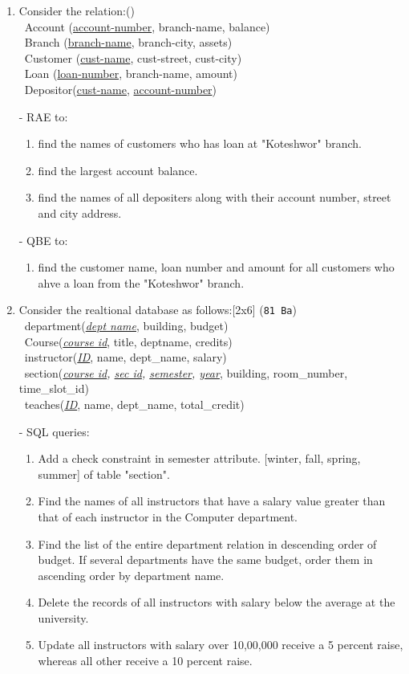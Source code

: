 \documentclass[12pt]{article}
\newcommand{\enter}{\\\textcolor{white}{1}}
\begin{document}
\begin{enumerate}
    \item Consider the relation:\hfill ()
        \enter Account (\underline{account-number}, branch-name, balance)
        \enter Branch (\underline{branch-name}, branch-city, assets)
        \enter Customer (\underline{cust-name}, cust-street, cust-city)
        \enter Loan (\underline{loan-number}, branch-name, amount)
        \enter Depositor(\underline{cust-name}, \underline{account-number})

        - RAE to:
        \begin{enumerate}[noitemsep, topsep = 0pt, label = \alph*.]
            \item find the names of customers who has loan at "Koteshwor" branch.
            \item find the largest account balance.
            \item find the names of all depositers along with their account number, street and city address.
        \end{enumerate}
        - QBE to:
                \begin{enumerate}[noitemsep, topsep = 0pt, label = \alph*.]
                    \item find the customer name, loan number and amount for all customers who ahve a loan from the "Koteshwor" branch.
        \end{enumerate}

    \item Consider the realtional database as follows:\hfill[2x6] (\texttt{81 Ba})
        \enter department(\textit{\underline{dept name}}, building, budget)
        \enter Course(\textit{\underline{course id}}, title, dept\textunderscore name, credits)
        \enter instructor(\textit{\underline{ID}}, name, dept\_name, salary)
        \enter section(\textit{\underline{course id}, \underline{sec id}, \underline{semester}, \underline{year}}, building, room\_number, time\_slot\_id)
        \enter teaches(\textit{\underline{ID}}, name, dept\_name, total\_credit)
    
        - SQL queries: 
        \begin{enumerate}[noitemsep, topsep = 0pt, label = \alph*.]
            \item Add a check constraint in semester attribute. [winter, fall, spring, summer] of table "section".
            \item Find the names of all instructors that have a salary value greater than that of each instructor in the Computer department.
            \item Find the list of the entire department relation in descending order of budget. If several departments have the same budget, order them in ascending order by department name.
            \item Delete the records of all instructors with salary below the average at the university.
            \item Update all instructors with salary over 10,00,000 receive a 5 percent raise, whereas all other receive a 10 percent raise.
        \end{enumerate}


\end{enumerate}
\end{document}
